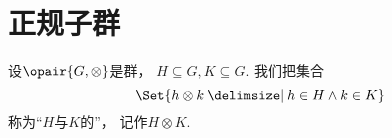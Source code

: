 %
%
%
%

\section{正规子群}
\begin{definition}
设\(\opair{G,\otimes}\)是群，
\(H \subseteq G,
K \subseteq G\).
我们把集合\[
	\Set{ h \otimes k \given h \in H \land k \in K }
\]
称为“\(H\)与\(K\)的”，
记作\(H \otimes K\).
\end{definition}


